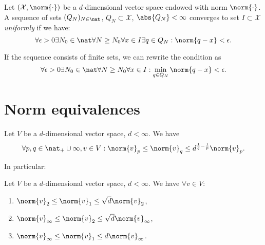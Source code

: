 \begin{defn}
Let $(\mathcal X,\norm{\cdot})$ be a $d$-dimensional vector space endowed with norm $\norm{\cdot}$.  
A sequence of sets $(Q_N)_{N \in \nat}$, $Q_N \subset \mathcal X$, $\abs{Q_N} < \infty$ converges to set $I \subset \mathcal X$ \textit{uniformly} if we have:
\[\forall \epsilon > 0 \exists N_0 \in \nat \forall N \geq N_0 \forall x \in I \exists q \in Q_N : \norm{q-x} < \epsilon. \]

If the sequence consists of finite sets, we can rewrite the condition as 
\[\forall \epsilon > 0 \exists N_0 \in \nat \forall N \geq N_0 \forall x \in I : \min_{q \in Q_N} \norm{q-x} < \epsilon. \]

\end{defn}


\section{Norm equivalences}

\begin{thm}
Let $V$ be a $d$-dimensional vector space, $d < \infty$. 
We have \[\forall p, q \in \nat_+ \cup \infty, v\in V: \norm{v}_p \leq \norm{v}_q \leq d^{\frac{1}{q} - \frac{1}{p}} \norm{v}_p.  \]
\end{thm}
In particular:
\begin{cor}
Let $V$ be a $d$-dimensional vector space, $d < \infty$. 
We have $\forall  v\in V:$ 
\begin{enumerate}
\item $\norm{v}_2 \leq \norm{v}_1 \leq \sqrt d \norm{v}_2$, 
\item $\norm{v}_\infty \leq \norm{v}_2 \leq \sqrt d \norm{v}_\infty$, 
\item $\norm{v}_\infty \leq \norm{v}_1 \leq d \norm{v}_\infty$.
\end{enumerate}
\end{cor}
